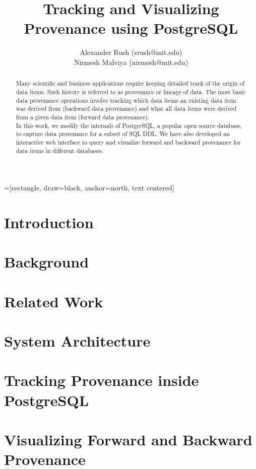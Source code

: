 \documentclass[11pt]{article}
\title{Tracking and Visualizing Provenance using PostgreSQL}
\author{Alexander Rush (srush@mit.edu)\\ Nirmesh Malviya (nirmesh@mit.edu)}
\begin{document}
=[rectangle, draw=black, anchor=north, text centered]
\maketitle

\begin{abstract}
Many scientific and business applications require keeping detailed track of the origin of data items. Such history is referred to as provenance or lineage of data. The most basic data provenance operations involve tracking which data items an existing data item was derived from (backward data provenance) and what all data items were derived from a given data item (forward data provenance). \\

In this work, we modify the internals of PostgreSQL, a popular open source database, to capture data provenance for a subset of SQL DDL. We have also developed an interactive web interface to query and visualize forward and backward provenance for data items in different databases.
\end{abstract}

\section{Introduction}


\section{Background} \label{background}


 \section{Related Work}	\label{related}


\section{System Architecture} \label{archi}




\section{Tracking Provenance inside PostgreSQL} \label{implement}



\section{Visualizing Forward and Backward Provenance} \label{visualizer}
\end{document}
